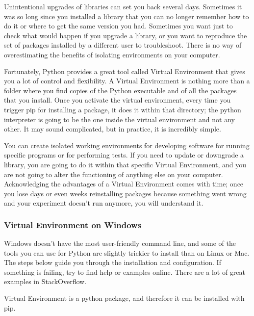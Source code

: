 Unintentional upgrades of libraries can set you back several days. Sometimes it was so long since you installed a library that you can no longer remember how to do it or where to get the same version you had. Sometimes you want just to check what would happen if you upgrade a library, or you want to reproduce the set of packages installed by a different user to troubleshoot. There is no way of overestimating the benefits of isolating environments on your computer.

Fortunately, Python provides a great tool called Virtual Environment that gives you a lot of control and flexibility. A Virtual Environment is nothing more than a folder where you find copies of the Python executable and of all the packages that you install. Once you activate the virtual environment, every time you trigger pip for installing a package, it does it within that directory; the python interpreter is going to be the one inside the virtual environment and not any other. It may sound complicated, but in practice, it is incredibly simple.

You can create isolated working environments for developing software for running specific programs or for performing tests. If you need to update or downgrade a library, you are going to do it within that specific Virtual Environment, and you are not going to alter the functioning of anything else on your computer. Acknowledging the advantages of a Virtual Environment comes with time; once you lose days or even weeks reinstalling packages because something went wrong and your experiment doesn't run anymore, you will understand it.


\subsubsection{Virtual Environment on Windows}
Windows doesn't have the most user-friendly command line, and some of the tools you can use for Python are slightly trickier to install than on Linux or Mac. The steps below guide you through the installation and configuration. If something is failing, try to find help or examples online. There are a lot of great examples in StackOverflow.

Virtual Environment is a python package, and therefore it can be installed with pip.

